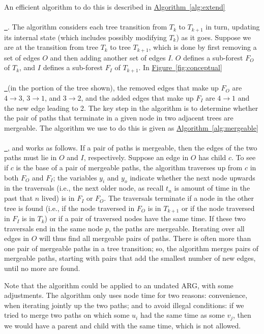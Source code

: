 \documentclass[10pt,twoside,lineno]{gsajnl}
\newcommand{\tskit}{\texttt{tskit}}
\newcommand{\algorithmref}[2][]{%
	\hyperref[{#2}]{%
		Algorithm~\ref*{#2}%
		\ifx\\#1\\%
		\else
		\,#1%
		\fi
	}%
}
\newcommand*{\figref}[2][]{%
	\hyperref[{#2}]{%
		Figure~\ref*{#2}%
		\ifx\\#1\\%
		\else
		\,#1%
		\fi
	}%
}
\begin{document}
An efficient algorithm to do this is described in \algorithmref{alg:extend}.
The algorithm considers each tree transition from $T_k$ to $T_{k+1}$ in turn, updating its internal state
(which includes possibly modifying $T_k$) as it goes.
Suppose we are at the transition from tree $T_k$ to tree $T_{k+1}$,
which is done by first removing a set of edges $O$
and then adding another set of edges $I$.
$O$ defines a sub-forest $F_O$ of $T_k$,
and $I$ defines a sub-forest $F_I$ of $T_{k+1}$.
In \figref{fig:conceptual} (in the portion of the tree shown),
the removed edges that make up $F_O$ 
are $4 \to 3$, $3 \to 1$, and $3 \to 2$,
and the added edges that make up $F_I$ are $4 \to 1$ and the new edge leading to 2.
The key step in the algorithm is to determine whether the pair of paths
that terminate in a given node in two adjacent trees are mergeable.
The algorithm we use to do this is given as \algorithmref{alg:mergeable},
and works as follows.
If a pair of paths is mergeable,
then the edges of the two paths must lie in $O$ and $I$, respectively.
Suppose an edge in $O$ has child $c$.
To see if $c$ is the base of a pair of mergeable paths,
the algorithm traverses up from $c$ in both $F_O$ and $F_I$;
the variables $y_i$ and $y_o$ indicate whether the next node upwards in the traversals
(i.e., the next older node, as recall $t_n$ is amount of time in the past that $n$ lived) 
is in $F_I$ or $F_O$.
The traversals terminate if a node in the other tree is found
(i.e., if the node traversed in $F_O$ is in $T_{k+1}$ or if the node traversed in $F_I$ is in $T_k$)
or if a pair of traversed nodes have the same time.
If these two traversals end in the same node $p$, the paths are mergeable.
Iterating over all edges in $O$ will thus find all mergeable pairs of paths.
There is often more than one pair of mergeable paths in a tree transition;
so, the algorithm merges pairs of mergeable paths,
starting with pairs that add the smallest number of new edges,
until no more are found.

Note that the algorithm could be applied to an undated ARG, 
with some adjustments.
The algorithm only uses node time for two reasons:
convenience, when iterating jointly up the two paths;
and to avoid illegal conditions: if we tried to merge two paths on which
some $u_i$ had the same time as some $v_j$,
then we would have a parent and child with the same time, which is not allowed.
\end{document}
